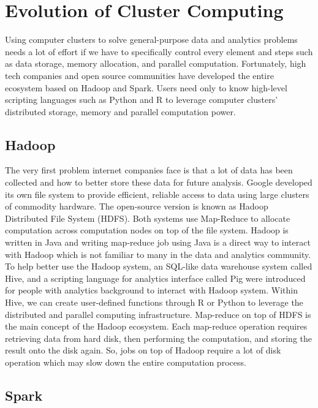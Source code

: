 \documentclass[12pt,]{krantz}
\begin{document}
\hypertarget{evolution-of-cluster-computing}{%
\section{Evolution of Cluster Computing}\label{evolution-of-cluster-computing}}

Using computer clusters to solve general-purpose data and analytics problems needs a lot of effort if we have to specifically control every element and steps such as data storage, memory allocation, and parallel computation. Fortunately, high tech companies and open source communities have developed the entire ecosystem based on Hadoop and Spark. Users need only to know high-level scripting languages such as Python and R to leverage computer clusters' distributed storage, memory and parallel computation power.

\hypertarget{hadoop}{%
\subsection{Hadoop}\label{hadoop}}

The very first problem internet companies face is that a lot of data has been collected and how to better store these data for future analysis. Google developed its own file system to provide efficient, reliable access to data using large clusters of commodity hardware. The open-source version is known as Hadoop Distributed File System (HDFS). Both systems use Map-Reduce to allocate computation across computation nodes on top of the file system. Hadoop is written in Java and writing map-reduce job using Java is a direct way to interact with Hadoop which is not familiar to many in the data and analytics community. To help better use the Hadoop system, an SQL-like data warehouse system called Hive, and a scripting language for analytics interface called Pig were introduced for people with analytics background to interact with Hadoop system. Within Hive, we can create user-defined functions through R or Python to leverage the distributed and parallel computing infrastructure. Map-reduce on top of HDFS is the main concept of the Hadoop ecosystem. Each map-reduce operation requires retrieving data from hard disk, then performing the computation, and storing the result onto the disk again. So, jobs on top of Hadoop require a lot of disk operation which may slow down the entire computation process.

\hypertarget{spark}{%
\subsection{Spark}\label{spark}}
\end{document}
